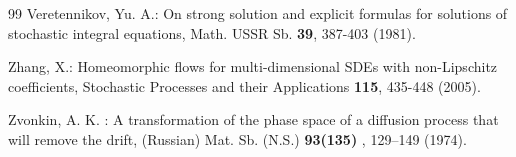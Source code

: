 \documentclass[a4paper,11pt]{article}
\begin{document}
\begin{thebibliography}{99}
  Veretennikov, Yu. A.: On strong solution and explicit formulas
for solutions of stochastic integral equations, Math. USSR Sb. \textbf{39},
387-403 (1981).

  Zhang, X.: Homeomorphic flows for multi-dimensional SDEs
with non-Lipschitz coefficients, Stochastic Processes and their Applications
\textbf{115}, 435-448 (2005).

  Zvonkin, A. K. : A transformation of the phase space of a
diffusion process that will remove the drift, (Russian) Mat. Sb. (N.S.)
\textbf{93(135)} , 129--149 (1974).
\end{thebibliography}
\end{document}
